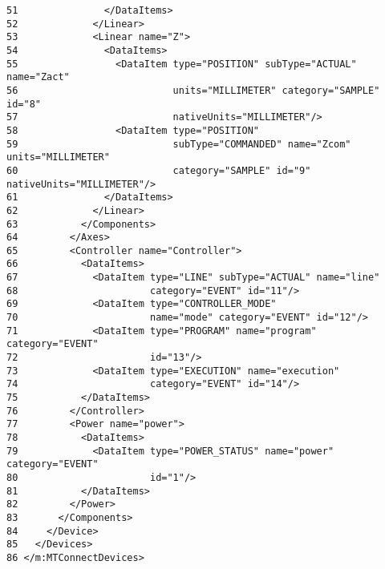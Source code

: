 \begin{verbatim}
51               </DataItems>
52             </Linear>
53             <Linear name="Z">
54               <DataItems>
55                 <DataItem type="POSITION" subType="ACTUAL" name="Zact"
56                           units="MILLIMETER" category="SAMPLE" id="8"
57                           nativeUnits="MILLIMETER"/> 
58                 <DataItem type="POSITION"
59                           subType="COMMANDED" name="Zcom" units="MILLIMETER"
60                           category="SAMPLE" id="9" nativeUnits="MILLIMETER"/>
61               </DataItems>
62             </Linear>
63           </Components>
64         </Axes>
65         <Controller name="Controller">
66           <DataItems>
67             <DataItem type="LINE" subType="ACTUAL" name="line"
68                       category="EVENT" id="11"/> 
69             <DataItem type="CONTROLLER_MODE"
70                       name="mode" category="EVENT" id="12"/>
71             <DataItem type="PROGRAM" name="program" category="EVENT"
72                       id="13"/> 
73             <DataItem type="EXECUTION" name="execution"
74                       category="EVENT" id="14"/>
75           </DataItems>
76         </Controller>
77         <Power name="power">
78           <DataItems>
79             <DataItem type="POWER_STATUS" name="power" category="EVENT"
80                       id="1"/>
81           </DataItems>
82         </Power>
83       </Components>
84     </Device>
85   </Devices>
86 </m:MTConnectDevices>

\end{verbatim}
